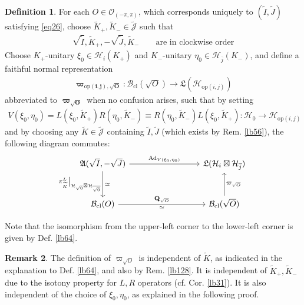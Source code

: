 \documentclass[11pt,b5paper,notitlepage]{article}
\theoremstyle{definition}
\newtheorem{df}{Definition}[section]
\newtheorem{rem}[df]{Remark}
\theoremstyle{plain}
\newcommand{\fk}{\mathfrak}
\newcommand{\wtd}{\widetilde}
\newcommand{\ovl}{\overline}
\newcommand{\Jtd}{\widetilde{\mathcal J}}
\newcommand{\Ad}{\mathrm{Ad}}
\newcommand{\MH}{\mathcal H}
\newcommand{\sqz}{{\sqrt 0}}
\newcommand{\Qbf}{\mathbf Q}
\newcommand{\Bcl}{\mathcal B_{\mathrm{cl}}}
\newcommand{\Opp}{\mathcal O_{(-\pi,\pi)}}
\newcommand{\Hopij}{\mathcal H_{\mathrm{op}(i,j)}}
\newcommand{\opij}{\mathrm{op}(i,j)}
\numberwithin{equation}{section}
\begin{document}
\begin{df}\label{lb120}
For each $O\in\Opp$, which corresponds uniquely to $(\wtd I,\wtd J)$ satisfying \eqref{eq26}, choose $\wtd K_+,\wtd K_-\in\Jtd$ such that
\begin{align}\label{eq62}
\sqrt{\wtd I},\wtd K_+, -\sqrt{\wtd J},\wtd K_- \qquad\text{are in clockwise order}
\end{align}
Choose $K_+$-unitary $\xi_0\in\MH_i(K_+)$ and $K_-$-unitary $\eta_0\in\MH_{\ovl j}(K_-)$, and define a faithful normal representation
\begin{align*}
\pmb{\varpi_{\opij,\sqrt O}}:\Bcl(\sqrt O)\rightarrow\fk L(\Hopij)
\end{align*}
abbreviated to $\pmb{\varpi_{\sqrt O}}$ when no confusion arises, such that by setting
\begin{align*}
V(\xi_0,\eta_0)=L(\xi_0,\wtd K_+)R(\eta_0,\wtd K_-)\equiv R(\eta_0,\wtd K_-)L(\xi_0,\wtd K_+): \MH_0\rightarrow\Hopij
\end{align*}
and by choosing any $\wtd K\in\Jtd$ containing $\wtd I,\wtd J$ (which exists by Rem. \ref{lb56}), the following diagram commutes:
\begin{equation}\label{eq61}
\begin{tikzcd}[row sep=1cm,column sep=3cm, ampersand replacement=\&]
\fk A(\sqrt I,-\sqrt J) \arrow[r,"{\Ad_{V(\xi_0,\eta_0)}}"] \arrow[d,"{\pi^L_{\wtd K}\big|_{\MH_\sqz\boxtimes\MH_{\ovl\sqz}}}"',"\simeq"]     \& \fk L(\MH_i\boxtimes\MH_{\ovl j}) \\
 \Bcl(O) \arrow[r,"\Qbf_{\sqrt O}","\simeq"'] \& \Bcl(\sqrt O) \arrow[u,"\varpi_{\sqrt O}"']
\end{tikzcd}
\end{equation}
\end{df}


Note that the isomorphism from the upper-left corner to the lower-left corner is given by Def. \ref{lb64}. 

\begin{rem}\label{lb148}
The definition of $\varpi_{\sqrt O}$ is independent of $\wtd K$, as indicated in the explanation to Def. \ref{lb64}, and also by Rem. \ref{lb128}. It is independent of $\wtd K_+,\wtd K_-$ due to the isotony property for $L,R$ operators (cf. Cor. \ref{lb31}). It is also independent of the choice of $\xi_0,\eta_0$, as explained in the following proof.
\end{rem}
\end{document}
